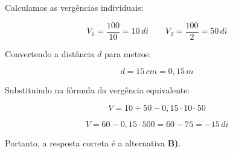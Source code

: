 \begin{flushleft}
Calculamos as verg\^encias individuais:

\[
V_1 = \frac{100}{10} = 10\,di
\qquad
V_2 = \frac{100}{2} = 50\,di
\]

Convertendo a dist\^ancia $d$ para metros:

\[
d = 15\,cm = 0{,}15\,m
\]

Substituindo na f\'ormula da verg\^encia equivalente:

\[
V = 10 + 50 - 0{,}15 \cdot 10 \cdot 50
\]

\[
V = 60 - 0{,}15 \cdot 500 = 60 - 75 = -15\,di
\]

\vspace{0.3cm}

Portanto, a resposta correta \'e a alternativa \colorbox{green!50}{\textbf{B)}}.

\end{flushleft}


